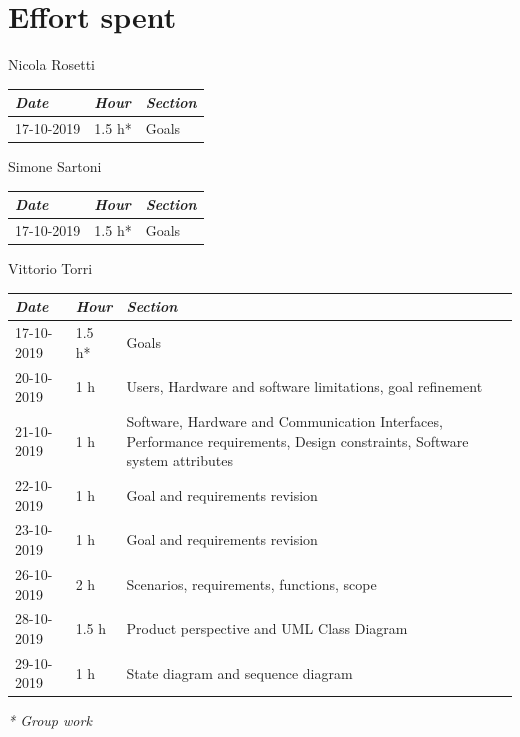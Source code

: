 \documentclass[a4paper]{report}
\begin{document}
\chapter{Effort spent}

\begin{center}
Nicola Rosetti \\
\begin{tabular}{p{2cm}p{1.5cm}p{7cm}}
\toprule
\textit{Date} & \textit{Hour} & \textit{Section} \\ \midrule
17-10-2019 & 1.5 h* & Goals \\
\bottomrule
\end{tabular}
\end{center}
\vspace*{1 cm}
\begin{center}
Simone Sartoni \\
\begin{tabular}{p{2cm}p{1.5cm}p{7cm}}
\toprule
\textit{Date} & \textit{Hour} & \textit{Section} \\ \midrule
17-10-2019 & 1.5 h* & Goals \\
\bottomrule
\end{tabular}
\end{center}
\vspace*{1 cm}
\begin{center}
Vittorio Torri \\
\begin{tabular}{p{2cm}p{1.5cm}p{7cm}}
\toprule
\textit{Date} & \textit{Hour} & \textit{Section} \\ \midrule
17-10-2019 & 1.5 h* & Goals \\ \midrule
20-10-2019 & 1 h & Users, Hardware and software limitations, goal refinement \\ \midrule
21-10-2019 & 1 h & Software, Hardware and Communication Interfaces, Performance requirements, Design constraints, Software system attributes \\ \midrule
22-10-2019 & 1 h & Goal and requirements revision \\ \midrule
23-10-2019 & 1 h & Goal and requirements revision \\ \midrule
26-10-2019 & 2 h & Scenarios, requirements, functions, scope \\ \midrule
28-10-2019 & 1.5 h & Product perspective and UML Class Diagram \\ \midrule
29-10-2019 & 1 h & State diagram and sequence diagram \\
\bottomrule
\end{tabular}
\end{center}
\textit{* Group work}
\end{document}
